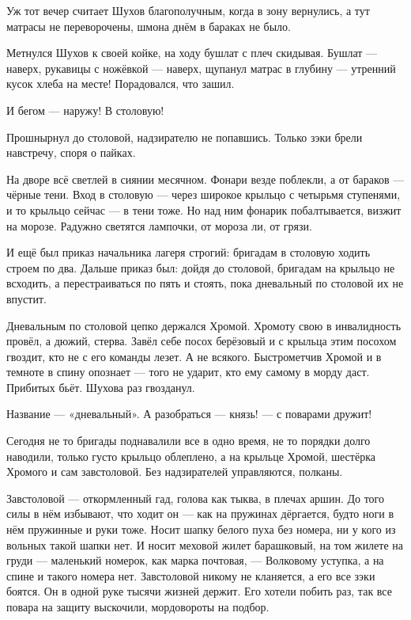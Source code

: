 Уж тот вечер считает Шухов благополучным, когда в зону вернулись, а тут матрасы не переворочены, шмона днём в бараках не было.

Метнулся Шухов к своей койке, на ходу бушлат с плеч скидывая. Бушлат --- наверх, рукавицы с ножёвкой --- наверх, щупанул матрас в глубину --- утренний кусок хлеба на месте! Порадовался, что зашил.

И бегом --- наружу! В столовую!

Прошнырнул до столовой, надзирателю не попавшись. Только зэки брели навстречу, споря о пайках.

На дворе всё светлей в сиянии месячном. Фонари везде поблекли, а от бараков --- чёрные тени. Вход в столовую --- через широкое крыльцо с четырьмя ступенями, и то крыльцо сейчас --- в тени тоже. Но над ним фонарик побалтывается, визжит на морозе. Радужно светятся лампочки, от мороза ли, от грязи.

И ещё был приказ начальника лагеря строгий: бригадам в столовую ходить строем по два. Дальше приказ был: дойдя до столовой, бригадам на крыльцо не всходить, а перестраиваться по пять и стоять, пока дневальный по столовой их не впустит.

Дневальным по столовой цепко держался Хромой. Хромоту свою в инвалидность провёл, а дюжий, стерва. Завёл себе посох берёзовый и с крыльца этим посохом гвоздит, кто не с его команды лезет. А не всякого. Быстрометчив Хромой и в темноте в спину опознает --- того не ударит, кто ему самому в морду даст. Прибитых бьёт. Шухова раз гвозданул.

Название --- «дневальный». А разобраться --- князь! --- с поварами дружит!

Сегодня не то бригады поднавалили все в одно время, не то порядки долго наводили, только густо крыльцо облеплено, а на крыльце Хромой, шестёрка Хромого и сам завстоловой. Без надзирателей управляются, полканы.

Завстоловой --- откормленный гад, голова как тыква, в плечах аршин. До того силы в нём избывают, что ходит он --- как на пружинах дёргается, будто ноги в нём пружинные и руки тоже. Носит шапку белого пуха без номера, ни у кого из вольных такой шапки нет. И носит меховой жилет барашковый, на том жилете на груди --- маленький номерок, как марка почтовая, --- Волковому уступка, а на спине и такого номера нет. Завстоловой никому не кланяется, а его все зэки боятся. Он в одной руке тысячи жизней держит. Его хотели побить раз, так все повара на защиту выскочили, мордовороты на подбор.

